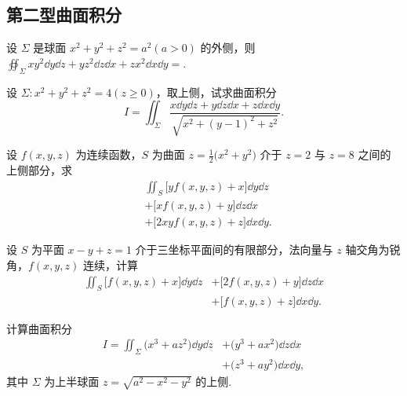\subsection{第二型曲面积分}

	\begin{ti}
		设 $\varSigma$ 是球面 $x^{2} + y^{2} + z^{2} = a^{2} (a > 0)$ 的外侧，则 $\oiint_{\varSigma} xy^{2} \dd{y}\dd{z} + yz^{2} \dd{z}\dd{x} + zx^{2} \dd{x}\dd{y} = $\htwo.
	\end{ti}

	\begin{ti}
		设 $\varSigma: x^{2} + y^{2} + z^{2} = 4 (z \geq 0)$，取上侧，试求曲面积分
		\[
			I = \iint_{\varSigma} \frac{x\dd{y}\dd{z} + y\dd{z}\dd{x} + z\dd{x}\dd{y}}{\sqrt{ x^{2} + (y - 1)^{2} + z^{2} }}.
		\]
	\end{ti}

	\begin{ti}
		设 $f(x,y,z)$ 为连续函数，$S$ 为曲面 $z = \frac{1}{2} \bigl( x^{2} + y^{2} \bigr)$ 介于 $z = 2$ 与 $z = 8$ 之间的上侧部分，求
		\begin{align*}
			&\iint_{S} \bigl[ y f(x,y,z) + x \bigr] \dd{y} \dd{z}\\
			&+ \bigl[ x f(x,y,z) + y \bigr] \dd{z} \dd{x}\\
			&+ \bigl[ 2xy f(x,y,z) + z \bigr] \dd{x} \dd{y}.
		\end{align*}
	\end{ti}

	\begin{ti}
		设 $S$ 为平面 $x - y + z = 1$ 介于三坐标平面间的有限部分，法向量与 $z$ 轴交角为锐角，$f(x,y,z)$ 连续，计算
		\begin{align*}
			\iint_{S} \bigl[ f(x,y,z) + x \bigr] \dd{y} \dd{z} &+ \bigl[ 2f(x,y,z) + y \bigr] \dd{z} \dd{x}\\
			&+ \bigl[ f(x,y,z) + z \bigr] \dd{x} \dd{y}.
		\end{align*}
	\end{ti}

	\begin{ti}
		计算曲面积分
		\begin{align*}
			I = \iint_{\varSigma} \bigl( x^{3} + az^{2} \bigr) \dd{y} \dd{z} &+ \bigl( y^{3} + ax^{2} \bigr) \dd{z} \dd{x}\\
			&+ \bigl( z^{3} + ay^{2} \bigr) \dd{x} \dd{y},
		\end{align*}
		其中 $\varSigma$ 为上半球面 $z = \sqrt{a^{2} - x^{2} - y^{2}}$ 的上侧.
	\end{ti}

